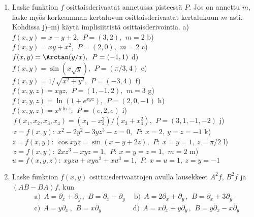 \begin{enumerate}
\item
Laske funktion $f$ osittaisderivaatat annetussa pisteessä $P$. Jos on annettu $m$, laske myös
korkeamman kertaluvun osittaisderivaatat kertalukuun $m$ asti. Kohdissa j)--m) käytä
implisiittistä osittaisderivointia. \vspace{1mm}\newline
a) \ $f(x,y)=x-y+2,\,\ P=(3,2),\,\ m=2$ \vspace{1mm}\newline
b) \ $f(x,y)=xy+x^2,\,\ P=(2,0),\,\ m=2$ \vspace{1mm}\newline
c) \ $f(x,y)=\Arctan(y/x),\,\ P=(-1,1)$ \vspace{1.2mm}\newline
d) \ $f(x,y)=\sin(x\sqrt{y}),\,\ P=(\pi/3,4)$ \vspace{1mm}\newline
e) \ $f(x,y)=1/\sqrt{x^2+y^2},\,\ P=(-3,4)$ \vspace{1.1mm}\newline
f) \ $f(x,y,z)=xyz,\,\ P=(1,-1,2),\,\ m=3$ \vspace{1mm}\newline
g) \ $f(x,y,z)=\ln(1+e^{xyz}),\,\ P=(2,0,-1)$ \vspace{1mm}\newline
h) \ $f(x,y,z)=x^{y\ln z},\,\ P=(e,2,e)$ \vspace{1mm}\newline
i) \ $\,f(x_1,x_2,x_3,x_4)=(x_1-x_2^2)/(x_3+x_4^2),\,\ P=(3,1,-1,-2)$ \vspace{1mm}\newline
j) \ $\,z=f(x,y): \ x^2-2y^2-3yz^3-z=0,\,\ P:\ x=2,\ y=z=-1$ \vspace{1mm}\newline
k) \ $z=f(x,y): \ \cos xyz=\sin(x-y+2z),\,\ P:\ x=y=1,\ z=\pi/2$ \vspace{1mm}\newline
l) \ $\,z=f(x,y): \ 2xz^3-xyz=1,\,\ P:\ x=y=z=1,\,\ m=2$ \vspace{1mm}\newline
m) \ $u=f(x,y,z): \ xyzu+xyu^2+xu^3=1,\,\ P:\ x=u=1,\ z=y=-1$

\item
Laske funktion $f(x,y)$ osittaisderivaattojen avulla lausekkeet $A^2f$, $B^2f$ ja 
$(AB-BA)f$, kun
\begin{align*}
&\text{a)}\ \ A=\partial_x+\partial_y\,,\,\ B=\partial_x-\partial_y \quad\ 
 \text{b)}\ \ A=2\partial_x+\partial_y\,,\,\ B=\partial_x+3\partial_y \\
&\text{c)}\ \ A=y\partial_x\,,\,\ B=x\partial_y \qquad\qquad\ \
 \text{d)}\ \ A=x\partial_x+y\partial_y\,,\,\ B=y\partial_x-x\partial_y
\end{align*}


\end{enumerate}
